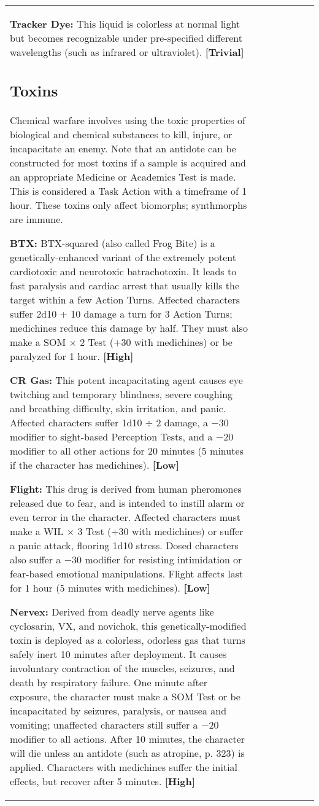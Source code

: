 \begin{tabular}{|l|l|l|l|l|l|l|}
\textbf{Tracker Dye:} This liquid is colorless at normal light but becomes recognizable under pre-specified different wavelengths (such as infrared or ultraviolet). \textbf{[Trivial]} 



\subsection{Toxins} \label{sec:toxins} 

Chemical warfare involves using the toxic properties of biological and chemical substances to kill, injure, or incapacitate an enemy. Note that an antidote can be constructed for most toxins if a sample is acquired and an appropriate Medicine or Academics Test is made. This is considered a Task Action with a timeframe of 1 hour. These toxins only affect biomorphs; synthmorphs are immune. 

\textbf{BTX:} BTX-squared (also called Frog Bite) is a genetically-enhanced variant of the extremely potent cardiotoxic and neurotoxic batrachotoxin. It leads to fast paralysis and cardiac arrest that usually kills the target within a few Action Turns. Affected characters suffer 2d10 + 10 damage a turn for 3 Action Turns; medichines reduce this damage by half. They must also make a SOM $\times$ 2 Test (+30 with medichines) or be paralyzed for 1 hour. \textbf{[High]} 

\textbf{CR Gas:} This potent incapacitating agent causes eye twitching and temporary blindness, severe coughing and breathing difficulty, skin irritation, and panic. Affected characters suffer 1d10 $\div$ 2 damage, a $-$30 modifier to sight-based Perception Tests, and a $-$20 modifier to all other actions for 20 minutes (5 minutes if the character has medichines). \textbf{[Low]} 

\textbf{Flight:} This drug is derived from human pheromones released due to fear, and is intended to instill alarm or even terror in the character. Affected characters must make a WIL $\times$ 3 Test (+30 with medichines) or suffer a panic attack, flooring 1d10 stress. Dosed characters also suffer a $-$30 modifier for resisting intimidation or fear-based emotional manipulations. Flight affects last for 1 hour (5 minutes with medichines). \textbf{[Low]} 

\textbf{Nervex:} Derived from deadly nerve agents like cyclosarin, VX, and novichok, this genetically-modified toxin is deployed as a colorless, odorless gas that turns safely inert 10 minutes after deployment. It causes involuntary contraction of the muscles, seizures, and death by respiratory failure. One minute after exposure, the character must make a SOM Test or be incapacitated by seizures, paralysis, or nausea and vomiting; unaffected characters still suffer a $-$20 modifier to all actions. After 10 minutes, the character will die unless an antidote (such as atropine, p. 323) is applied. Characters with medichines suffer the initial effects, but recover after 5 minutes. \textbf{[High]} 


\end{tabular}
